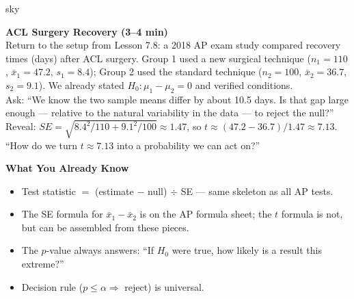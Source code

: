 \documentclass[10pt]{article}
\begin{document}
\begin{skillbox}[Hook]{sky}
\begin{minipage}[t]{0.55\linewidth}
    \textbf{ACL Surgery Recovery (3--4 min)}\\
    Return to the setup from Lesson 7.8: a 2018 AP exam study compared recovery times (days)
    after ACL surgery. Group 1 used a new surgical technique ($n_1 = 110$, $\bar x_1 = 47.2$,
    $s_1 = 8.4$); Group 2 used the standard technique ($n_2 = 100$, $\bar x_2 = 36.7$,
    $s_2 = 9.1$). We already stated $H_0: \mu_1 - \mu_2 = 0$ and verified conditions.\\[4pt]
    Ask: ``We know the two sample means differ by about 10.5 days. Is that gap large enough
    --- relative to the natural variability in the data --- to reject the null?''\\[4pt]
    Reveal: $SE = \sqrt{8.4^2/110 + 9.1^2/100} \approx 1.47$, so
    $t \approx (47.2 - 36.7)/1.47 \approx 7.13$.\\[4pt]
    ``How do we turn $t \approx 7.13$ into a probability we can act on?''
\end{minipage}
\hfill
\begin{minipage}[t]{0.40\linewidth}
    \textbf{What You Already Know}
    \begin{itemize}
        \item Test statistic $=$ (estimate $-$ null) $\div$ SE
              --- same skeleton as all AP tests.
        \item The SE formula for $\bar x_1 - \bar x_2$ is on the AP formula sheet;
              the $t$ formula is not, but can be assembled from these pieces.
        \item The $p$-value always answers: ``If $H_0$ were true, how likely is a
              result this extreme?''
        \item Decision rule ($p \le \alpha \Rightarrow$ reject) is universal.
    \end{itemize}
\end{minipage}
\end{skillbox}
\end{document}
